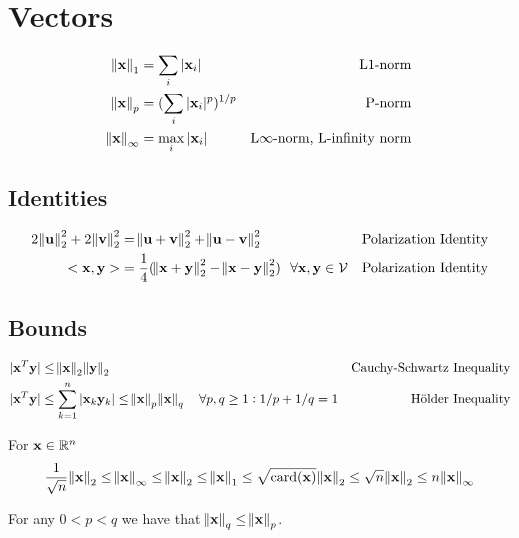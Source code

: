 \section{Vectors}

\begin{align}
\norm{\vx}_1      &= \sum_i |\vx_i| & \textrm{L1-norm\index{L1-norm}} \\
\norm{\vx}_p      &= (\sum_i |\vx_i|^p)^{1/p} & \textrm{P-norm\index{P-norm}} \\
\norm{\vx}_\infty &= \max_i |\vx_i| & \textrm{L$\infty$-norm\index{L$\infty$-norm}, L-infinity norm}
\end{align}

\subsection{Identities}

\begin{align}
2\norm{\mathbf{u}}_2^2+2\norm{\mathbf{v}}_2^2 &= \norm{\mathbf{u}+\mathbf{v}}_2^2 + \norm{\mathbf{u}-\mathbf{v}}_2^2 & \textrm{Polarization Identity} \\
<\mathbf{x},\mathbf{y}> &= \frac{1}{4}(\norm{\mathbf{x}+\mathbf{y}}_2^2-\norm{\mathbf{x}-\mathbf{y}}_2^2)~~\forall \mathbf{x},\mathbf{y}\in\mathcal{V} & \textrm{Polarization Identity}
\end{align}


\subsection{Bounds}

\begin{align}
|\mathbf{x}^T \mathbf{y}| &\le \norm{\mathbf{x}}_2 \norm{\mathbf{y}}_2 & \textrm{Cauchy-Schwartz Inequality} \\
|\mathbf{x}^T \mathbf{y}| &\le \sum_{k=1}^n |\mathbf{x}_k \mathbf{y}_k| \le \norm{\mathbf{x}}_p \norm{\mathbf{x}}_q~~~\forall p,q\ge1: 1/p+1/q=1 & \textrm{H\"older Inequality}
\end{align}

For $\mathbf{x}\in\mathbb{R}^n$
\begin{equation}
\frac{1}{\sqrt{n}}\norm{\mathbf{x}}_2
\le\norm{\mathbf{x}}_\infty
\le\norm{\mathbf{x}}_2
\le\norm{\mathbf{x}}_1
\le\sqrt{\textrm{card}(\mathbf{x})}\norm{\mathbf{x}}_2
\le\sqrt{n}\norm{\mathbf{x}}_2
\le n \norm{\mathbf{x}}_\infty
\end{equation}

For any $0<p<q$ we have that $\norm{\mathbf{x}}_q\le\norm{\mathbf{x}}_p$.